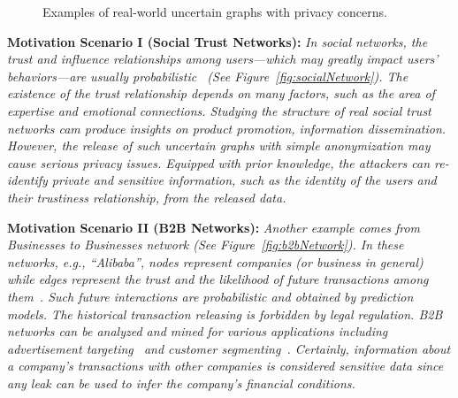\begin{figure}[!htb]
    \vspace{-5pt}
    \caption{Examples of real-world uncertain graphs with privacy concerns.}
    \vspace{-15pt}
\end{figure}
{\textbf{Motivation Scenario I (Social Trust Networks): }}
{\em 
In social networks, the trust and influence relationships among users---which may greatly impact users' behaviors---are usually probabilistic~\cite{Kempe_Maximizing_2003} 
(See Figure~\ref{fig:socialNetwork}). The existence of the trust relationship depends on many factors, such as the area of expertise and emotional connections.
Studying the structure of \emph{real} social trust networks cam produce insights on product promotion, information dissemination. 
However, the release of such uncertain graphs with simple anonymization may cause serious privacy issues.
Equipped with prior knowledge, the attackers can re-identify private and sensitive information, such as the identity of the users and their trustiness relationship, from the released data.
}

\vspace{2mm}
{\textbf{Motivation Scenario II (B2B Networks): }}
{\em  Another example comes from Businesses to Businesses network (See Figure~\ref{fig:b2bNetwork}). In these networks, e.g., ``Alibaba'', nodes represent companies (or business in general) 
while edges represent the trust and the likelihood of future transactions among them~\cite{Lin_B2B}. Such future interactions are probabilistic and obtained by prediction models. The historical transaction releasing is forbidden by legal regulation. 
B2B networks can be analyzed and mined for various applications including advertisement targeting~\cite{Abrahams20132777} and customer segmenting~\cite{alsina2015targeting}. 
Certainly, information about a company's transactions with other companies is considered sensitive data since any leak can be used to infer the company's financial conditions.
}
 
